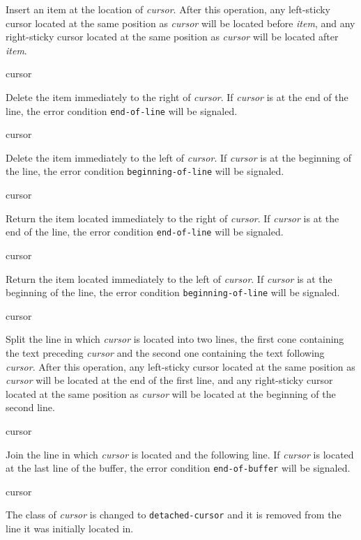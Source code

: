Insert an item at the location of \textit{cursor}.  After this
operation, any left-sticky cursor located at the same position as
\textit{cursor} will be located before \textit{item}, and any
right-sticky cursor located at the same position as \textit{cursor}
will be located after \textit{item}.

 {cursor}

Delete the item immediately to the right of \emph{cursor}.  If
\emph{cursor} is at the end of the line, the error condition
\texttt{end-of-line} will be signaled.

 {cursor}

Delete the item immediately to the left of \emph{cursor}.  If
\emph{cursor} is at the beginning of the line, the error condition
\texttt{beginning-of-line} will be signaled.

 {cursor}

Return the item located immediately to the right of \textit{cursor}.
If \emph{cursor} is at the end of the line, the error condition
\texttt{end-of-line} will be signaled.

 {cursor}

Return the item located immediately to the left of \textit{cursor}.
If \emph{cursor} is at the beginning of the line, the error condition
\texttt{beginning-of-line} will be signaled.

 {cursor}

Split the line in which \textit{cursor} is located into two lines, the
first cone containing the text preceding \textit{cursor} and the
second one containing the text following \textit{cursor}.  After this
operation, any left-sticky cursor located at the same position as
\textit{cursor} will be located at the end of the first line, and any
right-sticky cursor located at the same position as \textit{cursor}
will be located at the beginning of the second line.

 {cursor}

Join the line in which \textit{cursor} is located and the following
line.  If \textit{cursor} is located at the last line of the buffer,
the error condition \texttt{end-of-buffer} will be signaled.

 {cursor}

The class of \textit{cursor} is changed to \texttt{detached-cursor}
and it is removed from the line it was initially located in. 

